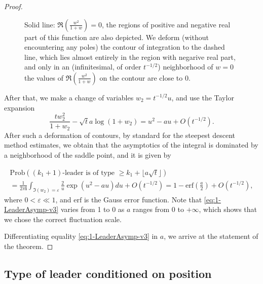 \documentclass[11pt,reqno]{amsart}
\theoremstyle{definition}
\theoremstyle{remark}
\theoremstyle{remark}
\def\geq{\geqslant}
\renewcommand\ge{\geq}
\newcommand{\eps}{\varepsilon}
\newcommand{\ii}{{\mathbf i}}
\numberwithin{equation}{section}
\begin{document}
\begin{proof}
\begin{figure}[ht]
			\caption{Solid line: $\Re \left( \frac{w^2}{1+w} \right)=0$, the regions of positive and negative real part of this function are also depicted. We deform (without encountering any poles) the contour of integration to the dashed line, which lies almost entirely in the region with negarive real part, and only in an (infinitesimal, of order $t^{-1/2}$) neighborhood of $w=0$ the values of $\Re \left( \frac{w^2}{1+w} \right)$ on the contour are close to 0. }
			\label{fig:steepest-1}
		\end{figure}
		
		After that, we make a change of variables $w_2 = t^{-1/2} u$, and use
		the Taylor expansion
		$$
		\frac{t w_2^2}{1+w_2} - \sqrt{t} a \log \left( 1 + w_2 \right) = u^2 - au + O \left( t^{-1/2} \right).
		$$
		After such a deformation of contours, by standard for the steepest descent method estimates, we obtain that the asymptotics of the integral is dominated by a neighborhood of the saddle point, and it is given by 
		
		\begin{multline}
			\label{eq:1-LeaderAsymp-v3}
			\mathrm{Prob} \left( \mbox{$(k_1+1)$-leader is of type $\ge k_1 + \lfloor a \sqrt{t} \rfloor$} \right) \\ = \frac{1}{2 \pi \ii} \int_{\Im (w_2) =  \eps}
			\frac{2}{u} \exp \left( u^2 - au \right) du + O \left( t^{-1/2} \right) = 1 - \mathrm{erf} \left( \frac{a}{2} \right) + O \left( t^{-1/2} \right),
		\end{multline}
		where $0 < \eps \ll 1$, and $\mathrm{erf}$ is the Gauss error function. Note that \eqref{eq:1-LeaderAsymp-v3} varies from 1 to 0 as $a$ ranges from $0$ to $+\infty$, which shows that we chose the correct fluctuation scale. 
		
		Differentiating equality \eqref{eq:1-LeaderAsymp-v3} in $a$, we arrive at the statement of the theorem.
	\end{proof}
	
	\subsection{Type of leader conditioned on position}
	
\end{document}
